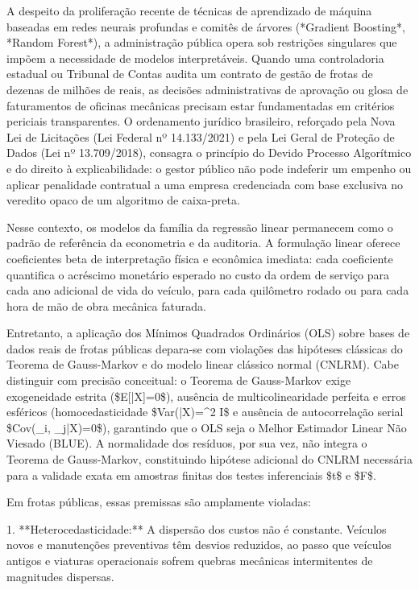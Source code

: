 \documentclass[12pt,a4paper]{article}
\begin{document}
A despeito da proliferação recente de técnicas de aprendizado de máquina baseadas em redes neurais profundas e comitês de árvores (*Gradient Boosting*, *Random Forest*), a administração pública opera sob restrições singulares que impõem a necessidade de modelos interpretáveis. Quando uma controladoria estadual ou Tribunal de Contas audita um contrato de gestão de frotas de dezenas de milhões de reais, as decisões administrativas de aprovação ou glosa de faturamentos de oficinas mecânicas precisam estar fundamentadas em critérios periciais transparentes. O ordenamento jurídico brasileiro, reforçado pela Nova Lei de Licitações (Lei Federal nº 14.133/2021) e pela Lei Geral de Proteção de Dados (Lei nº 13.709/2018), consagra o princípio do Devido Processo Algorítmico e do direito à explicabilidade: o gestor público não pode indeferir um empenho ou aplicar penalidade contratual a uma empresa credenciada com base exclusiva no veredito opaco de um algoritmo de caixa-preta.

Nesse contexto, os modelos da família da regressão linear permanecem como o padrão de referência da econometria e da auditoria. A formulação linear oferece coeficientes beta de interpretação física e econômica imediata: cada coeficiente quantifica o acréscimo monetário esperado no custo da ordem de serviço para cada ano adicional de vida do veículo, para cada quilômetro rodado ou para cada hora de mão de obra mecânica faturada.

Entretanto, a aplicação dos Mínimos Quadrados Ordinários (OLS) sobre bases de dados reais de frotas públicas depara-se com violações das hipóteses clássicas do Teorema de Gauss-Markov e do modelo linear clássico normal (CNLRM). Cabe distinguir com precisão conceitual: o Teorema de Gauss-Markov exige exogeneidade estrita (\$E[\epsilon|X]=0\$), ausência de multicolinearidade perfeita e erros esféricos (homocedasticidade \$Var(\epsilon|X)=\sigma^2 I\$ e ausência de autocorrelação serial \$Cov(\epsilon\_i, \epsilon\_j|X)=0\$), garantindo que o OLS seja o Melhor Estimador Linear Não Viesado (BLUE). A normalidade dos resíduos, por sua vez, não integra o Teorema de Gauss-Markov, constituindo hipótese adicional do CNLRM necessária para a validade exata em amostras finitas dos testes inferenciais \$t\$ e \$F\$.

Em frotas públicas, essas premissas são amplamente violadas:

1. **Heterocedasticidade:** A dispersão dos custos não é constante. Veículos novos e manutenções preventivas têm desvios reduzidos, ao passo que veículos antigos e viaturas operacionais sofrem quebras mecânicas intermitentes de magnitudes dispersas.
\end{document}
